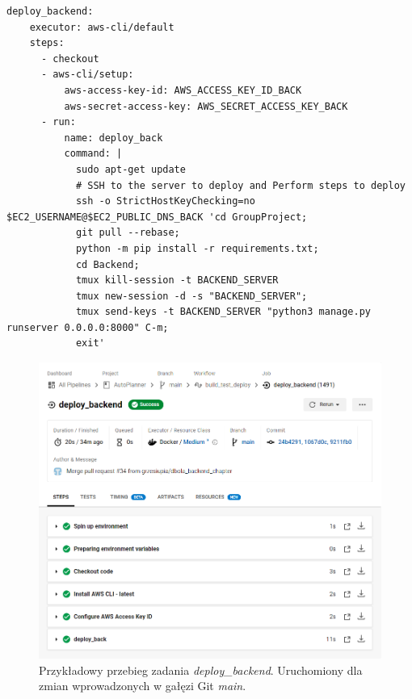 \begin{lstlisting}[caption=Część skryptu config.yml odpowiadająca za wykonanie zadania \textit{deploy\_backend},label={lst:deploy_back}]
deploy_backend:
    executor: aws-cli/default
    steps:
      - checkout
      - aws-cli/setup:
          aws-access-key-id: AWS_ACCESS_KEY_ID_BACK
          aws-secret-access-key: AWS_SECRET_ACCESS_KEY_BACK
      - run:
          name: deploy_back
          command: |
            sudo apt-get update
            # SSH to the server to deploy and Perform steps to deploy
            ssh -o StrictHostKeyChecking=no $EC2_USERNAME@$EC2_PUBLIC_DNS_BACK 'cd GroupProject; 
            git pull --rebase;
            python -m pip install -r requirements.txt;
            cd Backend;
            tmux kill-session -t BACKEND_SERVER
            tmux new-session -d -s "BACKEND_SERVER";
            tmux send-keys -t BACKEND_SERVER "python3 manage.py runserver 0.0.0.0:8000" C-m;
            exit'
\end{lstlisting}
\newpage
\begin{figure}[H]
\centering\includegraphics[width=\textwidth]{figures/circleci_deploy_back}
\caption{Przykładowy przebieg zadania \textit{deploy\_backend}. Uruchomiony dla zmian wprowadzonych w gałęzi Git \textit{main}.}\label{rys:deploy_back}
\end{figure}


